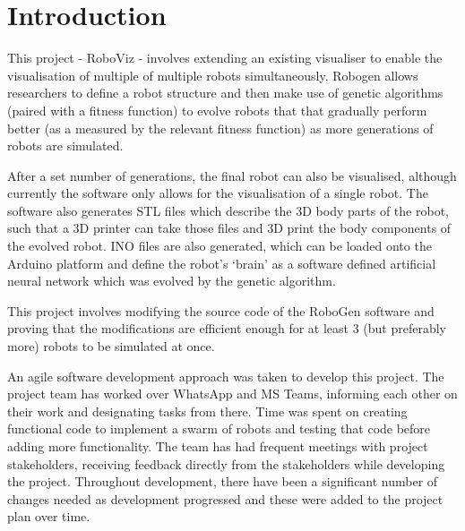 \documentclass[11pt,a4paper]{article}
\begin{document}
\tableofcontents
\section{Introduction}
\label{s:introduction}
%
%

This project - RoboViz - involves extending an existing visualiser
\cite{robogen} to enable the visualisation of multiple of multiple robots
simultaneously.  Robogen allows researchers to define a robot structure and
then make use of genetic algorithms (paired with a fitness function) to evolve
robots that that gradually perform better (as a measured by the relevant
fitness function) as more generations of robots are simulated.

After a set number of generations, the final robot can also be visualised,
although currently the software only allows for the visualisation of a single
robot. The software also generates STL files which describe the 3D body parts
of the robot, such that a 3D printer can take those files and 3D print the body
components of the evolved robot. INO files are also generated, which can be
loaded onto the Arduino platform and define the robot’s ‘brain’ as a software
defined artificial neural network which was evolved by the genetic algorithm.

This project involves modifying the source code of the RoboGen software and
proving that the modifications are efficient enough for at least 3 (but
preferably more) robots to be simulated at once.

An agile software development approach was taken to develop this project. The
project team has worked over WhatsApp and MS Teams, informing each other on
their work and designating tasks from there. Time was spent on creating
functional code to implement a swarm of robots and testing that code before
adding more functionality. The team has had frequent meetings with project
stakeholders, receiving feedback directly from the stakeholders while
developing the project. Throughout development, there have been a significant
number of changes needed as development progressed and these were added to the
project plan over time.
\end{document}
